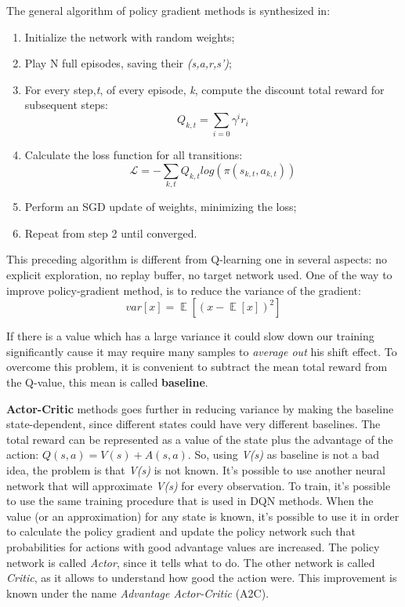 \documentclass[12pt]{article}
\DeclareMathOperator{\EX}{\mathbb{E}}%
\begin{document}
The general algorithm of policy gradient methods is synthesized in:
\begin{enumerate}
    \item Initialize the network with random weights;
    \item Play N full episodes, saving their \textit{(s,a,r,s')};
    \item For every step,\textit{t}, of every episode, \textit{k}, compute the discount total reward for subsequent steps: \[ Q_{k,t} = \sum_{i=0} \gamma^i r_i      \]
    \item  Calculate the loss function for all transitions: \[ \mathcal{L}= -\sum_{k,t} Q_{k,t} log( \pi(s_{k,t}, a_{k,t}))\]
    \item Perform an SGD update of weights, minimizing the loss;
    \item Repeat from step 2 until converged.
\end{enumerate}

This preceding algorithm is different from Q-learning one in several aspects: no explicit exploration, no replay buffer, no target network used.
One of the way to improve policy-gradient method, is to reduce the variance of the gradient:
\[var[x] = \EX[(x - \EX[x])^2]\]

If there is a value which has a large variance it could slow down our training significantly cause it may require many samples to \textit{average out} his shift effect. To overcome this problem, it is convenient to subtract the mean total reward from the Q-value, this mean is called \textbf{baseline}.

\textbf{Actor-Critic} methods goes further in reducing variance by making the baseline state-dependent, since different states could have very different baselines. The total reward can be represented as a value of the state plus the advantage of the action: $Q(s,a)=V(s)+A(s,a)$. So, using \textit{V(s)} as baseline is not a bad idea, the problem is that \textit{V(s)} is not known. It's possible to use another neural network that will approximate \textit{V(s)} for every observation. To train, it's possible to use the same training procedure that is used in DQN methods. 
When the value (or an approximation) for any state is known, it's possible to use it in order to calculate the policy gradient and update the policy network such that probabilities for actions with good advantage values are increased. The policy network is called \textit{Actor}, since it tells what to do. The other network is called \textit{Critic}, as it allows to understand how good the action were. This improvement is known under the name \textit{Advantage Actor-Critic} (A2C). 
\end{document}
